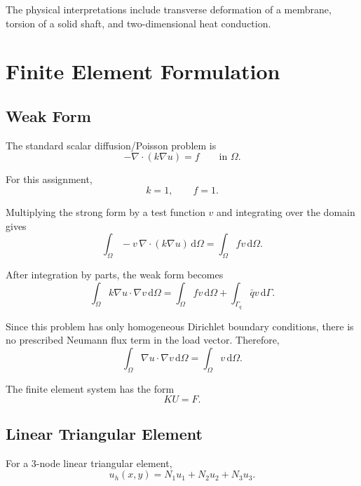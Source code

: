 \documentclass[14pt,a4paper]{article}
\newcommand{\dd}{\,\mathrm{d}}
\newcommand{\grad}{\nabla}
\begin{document}
The physical interpretations include transverse deformation of a membrane, torsion of a solid shaft, and two-dimensional heat conduction.

\section{Finite Element Formulation}

\subsection{Weak Form}

The standard scalar diffusion/Poisson problem is
\begin{equation}
    -\grad\cdot(k\grad u)=f \qquad \text{in } \Omega.
\end{equation}

For this assignment,
\begin{equation}
    k=1, \qquad f=1.
\end{equation}

Multiplying the strong form by a test function $v$ and integrating over the domain gives
\begin{equation}
    \int_{\Omega} -v\,\grad\cdot(k\grad u)\dd\Omega
    =
    \int_{\Omega} fv\dd\Omega.
\end{equation}

After integration by parts, the weak form becomes
\begin{equation}
    \int_{\Omega} k\grad u\cdot \grad v\dd\Omega
    =
    \int_{\Omega} fv\dd\Omega
    +
    \int_{\Gamma_q} \bar q v\dd\Gamma.
\end{equation}

Since this problem has only homogeneous Dirichlet boundary conditions, there is no prescribed Neumann flux term in the load vector. Therefore,
\begin{equation}
    \int_{\Omega} \grad u\cdot \grad v\dd\Omega
    =
    \int_{\Omega} v\dd\Omega.
\end{equation}

The finite element system has the form
\begin{equation}
    KU=F.
\end{equation}

\subsection{Linear Triangular Element}

For a 3-node linear triangular element,
\begin{equation}
    u_h(x,y)=N_1u_1+N_2u_2+N_3u_3.
\end{equation}
\end{document}
